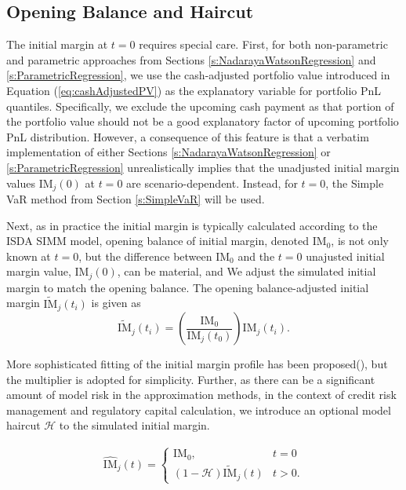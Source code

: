 \documentclass[preprint,12pt]{elsarticle}
\begin{document}
\subsection{Opening Balance and Haircut} \label{s:OpeningBalanceAndHaircut}

The initial margin at $t=0$ requires special care. First, for both non-parametric and parametric approaches from Sections \ref{s:NadarayaWatsonRegression} and \ref{s:ParametricRegression}, we use the cash-adjusted portfolio value introduced in Equation (\ref{eq:cashAdjustedPV}) as the explanatory variable for portfolio PnL quantiles. Specifically, we exclude the upcoming cash payment as that portion of the portfolio value should not be a good explanatory factor of upcoming portfolio PnL distribution. However, a consequence of this feature is that a verbatim implementation of either Sections \ref{s:NadarayaWatsonRegression} or \ref{s:ParametricRegression} unrealistically implies that the unadjusted initial margin values $\textrm{IM}_{j}(0)$ at $t=0$ are scenario-dependent. Instead, for $t=0$, the Simple VaR method from Section \ref{s:SimpleVaR} will be used.

Next, as in practice the initial margin is typically calculated according to the ISDA SIMM model, opening balance of initial margin, denoted $\textrm{IM}_{0}$, is not only known at $t=0$, but the difference between $\textrm{IM}_{0}$ and the $t=0$ unajusted initial margin value, $\textrm{IM}_{j}(0)$, can be material, and We  adjust the simulated initial margin to match the opening balance. The opening balance-adjusted initial margin $\widetilde{\textrm{IM}}_{j}(t_{i})$ is given as
\begin{equation}
\widetilde{\textrm{IM}}_{j}(t_{i})=\left(\frac{\textrm{IM}_{0}}{\textrm{IM}_{j}(t_{0})}\right)\textrm{IM}_{j}(t_{i}).
\end{equation} 

More sophisticated fitting of the initial margin profile has been proposed(\cite{anfuso2016sound}), but the multiplier is adopted for simplicity. Further, as there can be a significant amount of model risk in the approximation methods, in the context of credit risk management and regulatory capital calculation, we introduce an optional model haircut $\mathcal{H}$ to the simulated initial margin. 

\begin{eqnarray}
\widehat{\textrm{IM}}_{j}(t)=\begin{cases}
\textrm{IM}_{0}, & t=0\\
\left(1-\mathcal{H}\right)\widetilde{\textrm{IM}}_{j}(t) & t>0.
\end{cases}
\end{eqnarray} 
\end{document}

